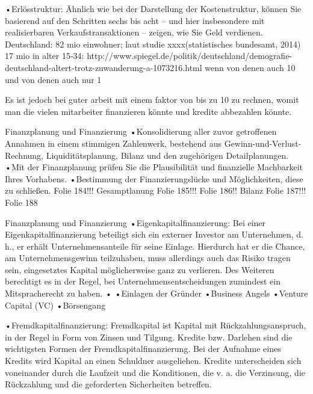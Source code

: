 •Erlösstruktur: Ähnlich wie bei der Darstellung der Kostenstruktur, können Sie basierend auf den Schritten sechs bis acht – und hier insbesondere mit realisierbaren Verkaufstransaktionen – zeigen, wie Sie Geld verdienen.
Deutschland: 82 mio einwohner; laut studie xxxx(statistisches bundesamt, 2014) 17 mio in alter 15-34:
http://www.spiegel.de/politik/deutschland/demografie-deutschland-altert-trotz-zuwanderung-a-1073216.html
wenn von denen auch 10%
und von denen auch nur 1%

Es ist jedoch bei guter arbeit mit einem faktor von bis zu 10 zu rechnen, womit man die vielen mitarbeiter finanzieren könnte und kredite abbezahlen könnte.



Finanzplanung und Finanzierung
•Konsolidierung aller zuvor getroffenen Annahmen in einem stimmigen Zahlenwerk, bestehend aus Gewinn-und-Verlust-Rechnung, Liquiditätsplanung, Bilanz und den zugehörigen Detailplanungen.
•Mit der Finanzplanung prüfen Sie die Plausibilität und finanzielle Machbarkeit Ihres Vorhabens.
•Bestimmung der Finanzierungslücke und Möglichkeiten, diese zu schließen.
Folie 184!!! Gesamptlanung
Folie 185!!!
Folie 186!!
Bilanz Folie 187!!!
Folie 188


Finanzplanung und Finanzierung
•Eigenkapitalfinanzierung: Bei einer Eigenkapitalfinanzierung beteiligt sich ein externer Investor am Unternehmen, d. h., er erhält Unternehmensanteile für seine Einlage. Hierdurch hat er die Chance, am Unternehmensgewinn teilzuhaben, muss allerdings auch das Risiko tragen sein, eingesetztes Kapital möglicherweise ganz zu verlieren. Des Weiteren berechtigt es in der Regel, bei Unternehmensentscheidungen zumindest ein Mitspracherecht zu haben. •
•Einlagen der Gründer
•Business Angels
•Venture Capital (VC)
•Börsengang

•Fremdkapitalfinanzierung: Fremdkapital ist Kapital mit Rückzahlungsanspruch, in der Regel in Form von Zinsen und Tilgung. Kredite bzw. Darlehen sind die wichtigsten Formen der Fremdkapitalfinanzierung. Bei der Aufnahme eines Kredits wird Kapital an einen Schuldner ausgeliehen. Kredite unterscheiden sich voneinander durch die Laufzeit und die Konditionen, die v. a. die Verzinsung, die Rückzahlung und die geforderten Sicherheiten betreffen.


